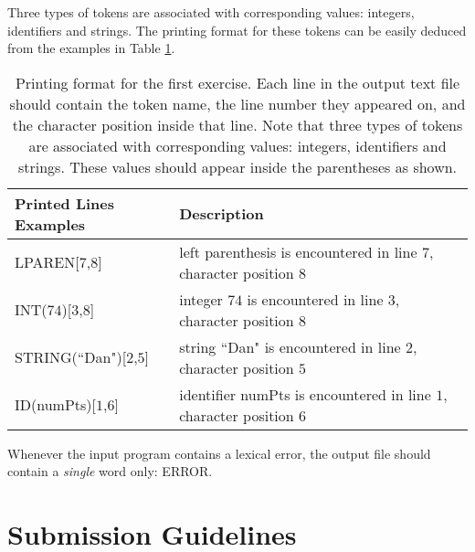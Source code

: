 \documentclass{article}
\begin{document}
Three types of tokens are associated with corresponding values: integers, identifiers and strings.
The printing format for these tokens can be easily deduced from the examples in Table
\ref{Table_Token_Printing_Examples_For_Exercise_1}.
\begin{table}[h]
\centering
\begin{tabular}{|l|l| }
Printed Lines Examples & Description \\
\hline
\hline
LPAREN[$7$,$8$] & left parenthesis is encountered in line $7$, character position $8$ \\
\hline
INT($74$)[$3$,$8$] & integer $74$ is encountered in line $3$, character position $8$ \\
\hline
STRING(``Dan")[$2$,$5$] & string ``Dan" is encountered in line $2$, character position $5$ \\
\hline
ID(numPts)[$1$,$6$] & identifier numPts is encountered in line $1$, character position $6$ \\
\hline
\end{tabular}
\caption{
Printing format for the first exercise.
Each line in the output text file should contain the token name,
the line number they appeared on, and the character position inside that line.
Note that three types of tokens are associated with corresponding values:
integers, identifiers and strings.
These values should appear inside the parentheses as shown.
\label{Table_Token_Printing_Examples_For_Exercise_1}}
\end{table}
Whenever the input program contains a lexical error, the output file
should contain a \textit{single} word only: ERROR.
\section{Submission Guidelines}
\end{document}

